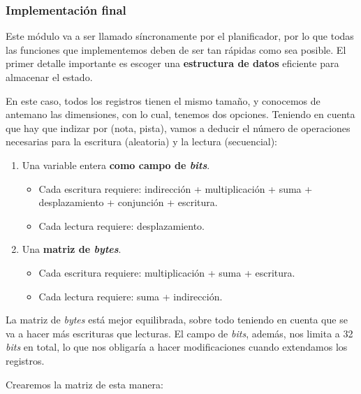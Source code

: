\subsubsection{Implementación final}

Este módulo va a ser llamado síncronamente por el planificador, por lo que todas las funciones que implementemos deben de ser tan rápidas como sea posible. El primer detalle importante es escoger una \textbf{estructura de datos} eficiente para almacenar el estado.

En este caso, todos los registros tienen el mismo tamaño, y conocemos de antemano las dimensiones, con lo cual, tenemos dos opciones. Teniendo en cuenta que hay que indizar por (nota, pista), vamos a deducir el número de operaciones necesarias para la escritura (aleatoria) y la lectura (secuencial):

\begin{enumerate}
	\item Una variable entera \textbf{como campo de \textit{bits}}.
	\begin{itemize}
		\item Cada escritura requiere: indirección + multiplicación + suma + desplazamiento + conjunción + escritura. 
		\item Cada lectura requiere: desplazamiento.
	\end{itemize}
	
	\item Una \textbf{matriz de \textit{bytes}}.
	
	\begin{itemize}
		\item Cada escritura requiere: multiplicación + suma + escritura.
		\item Cada lectura requiere: suma + indirección.
	\end{itemize}
\end{enumerate}

La matriz de \textit{bytes} está mejor equilibrada, sobre todo teniendo en cuenta que se va a hacer más escrituras que lecturas. El campo de \textit{bits}, además, nos limita a 32 \textit{bits} en total, lo que nos obligaría a hacer modificaciones cuando extendamos los registros.

Crearemos la matriz de esta manera:

\smallskip

